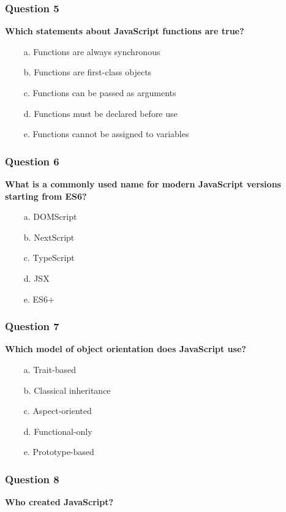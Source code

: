 \documentclass{article}
\newcommand{\cmark}{\textcolor{green}{\ding{51}}} %
\newcommand{\xmark}{\textcolor{red}{\ding{55}}}   %
\begin{document}
\subsubsection*{Question 5}
\textbf{Which statements about JavaScript functions are true?}

\begin{itemize}
  \item[\xmark\ a.] Functions are always synchronous
  \item[\cmark\ b.] Functions are first-class objects
  \item[\cmark\ c.] Functions can be passed as arguments
  \item[\xmark\ d.] Functions must be declared before use
  \item[\xmark\ e.] Functions cannot be assigned to variables
\end{itemize}
 
\subsubsection*{Question 6}
\textbf{What is a commonly used name for modern JavaScript versions starting from ES6?}

\begin{itemize}
  \item[\xmark\ a.] DOMScript
  \item[\xmark\ b.] NextScript
  \item[\xmark\ c.] TypeScript
  \item[\xmark\ d.] JSX
  \item[\cmark\ e.] ES6+
\end{itemize}

\subsubsection*{Question 7}
\textbf{Which model of object orientation does JavaScript use?}

\begin{itemize}
  \item[\xmark\ a.] Trait-based
  \item[\xmark\ b.] Classical inheritance
  \item[\xmark\ c.] Aspect-oriented
  \item[\xmark\ d.] Functional-only
  \item[\cmark\ e.] Prototype-based
\end{itemize}

\subsubsection*{Question 8}
\textbf{Who created JavaScript?}
\end{document}
